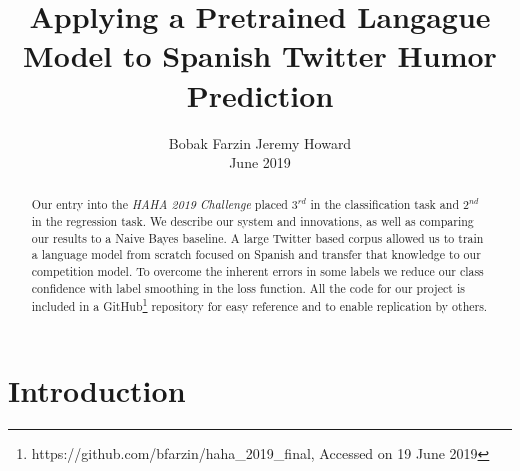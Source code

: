 \documentclass[runningheads]{llncs}
\begin{document}
\title{Applying a Pretrained Langague Model to Spanish Twitter Humor Prediction}
\author{Bobak Farzin  Jeremy Howard  \\June 2019}
%
%


\maketitle

\begin{abstract}
Our entry into the \textit{HAHA 2019 Challenge} placed $3^{rd}$ in the classification task and $2^{nd}$ in the regression task.  We describe our system and innovations, as well as comparing our results to a Naive Bayes baseline.
A large Twitter based corpus allowed us to train a language model from scratch focused on Spanish and transfer that knowledge to our competition model.  To overcome the inherent errors in some labels we reduce our class confidence with label smoothing in the loss function.
All the code for our project is included in a GitHub\footnote{https://github.com/bfarzin/haha\_2019\_final, Accessed on 19 June 2019} repository for easy reference and to enable replication by others.

\end{abstract}

\section{Introduction}
\label{intro}
\newcommand{\chapquote}[3]{\begin{quotation} \textit{#1} \end{quotation} \begin{flushright} - #2, \textit{#3}\end{flushright} }
\end{document}
